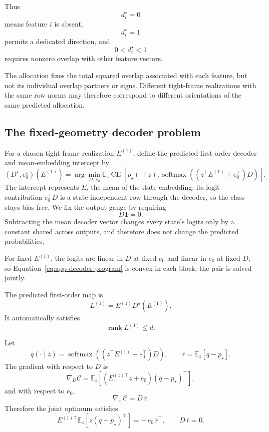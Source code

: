 Thus
\[
d_i^\star=0
\]
means feature \(i\) is absent,
\[
d_i^\star=1
\]
permits a dedicated direction, and
\[
0<d_i^\star<1
\]
requires nonzero overlap with other feature vectors.

The allocation fixes the total squared overlap associated with each feature, but
not its individual overlap partners or signs. Different tight-frame realizations
with the same row norms may therefore correspond to different orientations of the
same predicted allocation.

\subsection{The fixed-geometry decoder problem}

For a chosen tight-frame realization \(E^{(1)}\), define the predicted first-order
decoder and mean-embedding intercept by
\begin{equation}
\boxed{
\left(D^\star,e_0^\star\right)(E^{(1)})
=
\arg\min_{D,\,e_0}
\mathbb E_z
\operatorname{CE}
\left[
p_\star(\cdot\mid z),
\operatorname{softmax}
\left(
\left(z^\top E^{(1)}+e_0^\top\right)D
\right)
\right].
}
\label{eq:app-decoder-program}
\end{equation}
The intercept represents \(\bar E\), the mean of the state embedding: its logit
contribution \(e_0^\top D\) is a state-independent row through the decoder, so the
class stays bias-free. We fix the output gauge by requiring
\begin{equation}
D\mathbf1=0.
\label{eq:app-decoder-gauge}
\end{equation}
Subtracting the mean decoder vector changes every state's logits only by a constant
shared across outputs, and therefore does not change the predicted probabilities.

For fixed \(E^{(1)}\), the logits are linear in \(D\) at fixed \(e_0\) and linear in
\(e_0\) at fixed \(D\), so Equation~\eqref{eq:app-decoder-program} is convex in each
block; the pair is solved jointly.

The predicted first-order map is
\begin{equation}
\boxed{
L^{(1)}
=
E^{(1)}D^\star(E^{(1)}).
}
\label{eq:app-predicted-map}
\end{equation}
It automatically satisfies
\[
\operatorname{rank}L^{(1)}\le d.
\]

Let
\[
q(\cdot\mid z)
=
\operatorname{softmax}
\left(
\left(z^\top E^{(1)}+e_0^\top\right)D
\right),
\qquad
\bar r=\mathbb E_z\left[q-p_\star\right].
\]
The gradient with respect to \(D\) is
\[
\nabla_D\mathcal C
=
\mathbb E_z
\left[
\left(E^{(1)\top}z+e_0\right)
\left(q-p_\star\right)^\top
\right],
\]
and with respect to \(e_0\),
\[
\nabla_{e_0}\mathcal C
=
D\,\bar r.
\]
Therefore the joint optimum satisfies
\begin{equation}
\boxed{
E^{(1)\top}
\mathbb E_z
\left[
z\left(q-p_\star\right)^\top
\right]
=
-\,e_0\,\bar r^\top,
\qquad
D\,\bar r=0.
}
\label{eq:app-moment-matching}
\end{equation}

